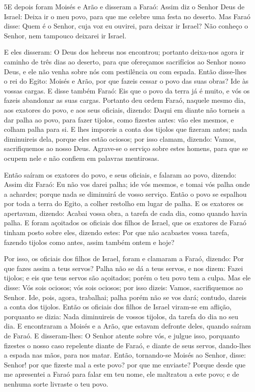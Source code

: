 \medskip

\lettrine{5} E depois foram Moisés e Arão e disseram a Faraó:
Assim diz o Senhor Deus de Israel: Deixa ir o meu povo, para que me
celebre uma festa no deserto. Mas Faraó disse: Quem é o Senhor,
cuja voz eu ouvirei, para deixar ir Israel? Não conheço o Senhor,
nem tampouco deixarei ir Israel.

E eles disseram: O Deus dos hebreus nos encontrou; portanto
deixa-nos agora ir caminho de três dias ao deserto, para que
ofereçamos sacrifícios ao Senhor nosso Deus, e ele não venha sobre
nós com pestilência ou com espada. Então disse-lhes o rei do
Egito: Moisés e Arão, por que fazeis cessar o povo das suas obras?
Ide às vossas cargas. E disse também Faraó: Eis que o povo da
terra já é muito, e vós os fazeis abandonar as suas cargas.
Portanto deu ordem Faraó, naquele mesmo dia, aos exatores do
povo, e aos seus oficiais, dizendo: Daqui em diante não torneis
a dar palha ao povo, para fazer tijolos, como fizestes antes: vão
eles mesmos, e colham palha para si. E lhes imporeis a conta dos
tijolos que fizeram antes; nada diminuireis dela, porque eles estão
ociosos; por isso clamam, dizendo: Vamos, sacrifiquemos ao nosso
Deus. Agrave-se o serviço sobre estes homens, para que se ocupem
nele e não confiem em palavras mentirosas.

Então saíram os exatores do povo, e seus oficiais, e falaram ao
povo, dizendo: Assim diz Faraó: Eu não vos darei palha; ide
vós mesmos, e tomai vós palha onde a achardes; porque nada se
diminuirá de vosso serviço. Então o povo se espalhou por toda
a terra do Egito, a colher restolho em lugar de palha. E os
exatores os apertavam, dizendo: Acabai vossa obra, a tarefa de cada
dia, como quando havia palha. E foram açoitados os oficiais
dos filhos de Israel, que os exatores de Faraó tinham posto sobre
eles, dizendo estes: Por que não acabastes vossa tarefa, fazendo
tijolos como antes, assim também ontem e hoje?

Por isso, os oficiais dos filhos de Israel, foram e clamaram a
Faraó, dizendo: Por que fazes assim a teus servos? Palha não
se dá a teus servos, e nos dizem: Fazei tijolos; e eis que teus
servos são açoitados; porém o teu povo tem a culpa. Mas ele
disse: Vós sois ociosos; vós sois ociosos; por isso dizeis: Vamos,
sacrifiquemos ao Senhor. Ide, pois, agora, trabalhai; palha
porém não se vos dará; contudo, dareis a conta dos tijolos.
Então os oficiais dos filhos de Israel viram-se em aflição,
porquanto se dizia: Nada diminuireis de vossos tijolos, da tarefa do
dia no seu dia. E encontraram a Moisés e a Arão, que estavam
defronte deles, quando saíram de Faraó. E disseram-lhes: O
Senhor atente sobre vós, e julgue isso, porquanto fizestes o nosso
caso repelente diante de Faraó, e diante de seus servos, dando-lhes
a espada nas mãos, para nos matar. Então, tornando-se Moisés
ao Senhor, disse: Senhor! por que fizeste mal a este povo? por que
me enviaste? Porque desde que me apresentei a Faraó para
falar em teu nome, ele maltratou a este povo; e de nenhuma sorte
livraste o teu povo.

